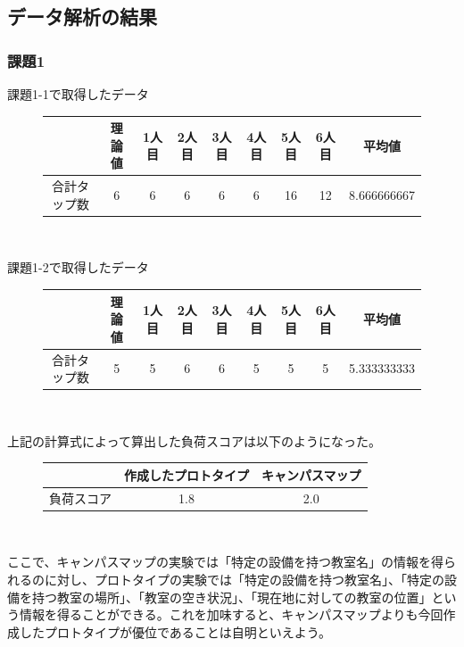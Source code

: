 \documentclass[12pt,a4paper,dvipdf]{jsarticle}
\begin{document}
\subsection{データ解析の結果}
\subsubsection{課題1}
課題1-1で取得したデータ\\
\begin{figure}[H]
    \centering
    \begin{tabular}{c|c|c|c|c|c|c|c|c}
               & 理論値 & 1人目 & 2人目 & 3人目 & 4人目 & 5人目 & 6人目 & 平均値         \\
        \hline
        合計タップ数 & 6   & 6   & 6   & 6   & 6   & 16  & 12  & 8.666666667
    \end{tabular}\\
\end{figure}
課題1-2で取得したデータ\\
\begin{figure}[H]
    \centering
    \begin{tabular}{c|c|c|c|c|c|c|c|c}
               & 理論値 & 1人目 & 2人目 & 3人目 & 4人目 & 5人目 & 6人目 & 平均値         \\
        \hline
        合計タップ数 & 5   & 5   & 6   & 6   & 5   & 5   & 5   & 5.333333333
    \end{tabular}\\
\end{figure}
上記の計算式によって算出した負荷スコアは以下のようになった。
\begin{figure}[H]
    \centering
    \begin{tabular}{c|cc}
              & 作成したプロトタイプ & キャンパスマップ \\
        \hline
        負荷スコア & 1.8        & 2.0
    \end{tabular}\\
\end{figure}
ここで、キャンパスマップの実験では「特定の設備を持つ教室名」の情報を得られるのに対し、プロトタイプの実験では「特定の設備を持つ教室名」、「特定の設備を持つ教室の場所」、「教室の空き状況」、「現在地に対しての教室の位置」という情報を得ることができる。これを加味すると、キャンパスマップよりも今回作成したプロトタイプが優位であることは自明といえよう。
\end{document}
